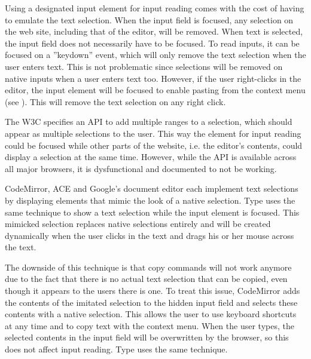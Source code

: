 Using a designated input element for input reading comes with the cost of having to emulate the text selection. When the input field is focused, any selection on the web site, including that of the editor, will be removed. When text is selected, the input field does not necessarily have to be focused. To read inputs, it can be focused on a ''keydown'' event, which will only remove the text selection when the user enters text. This is not problematic since selections will be removed on native inputs when a user enters text too. However, if the user right-clicks in the editor, the input element will be focused to enable pasting from the context menu (see ). This will remove the text selection on any right click.

The W3C specifies an API to add multiple ranges to a selection, which should appear as multiple selections to the user. This way the element for input reading could be focused while other parts of the website, i.e. the editor's contents, could display a selection at the same time. However, while the API is available across all major browsers, it is dysfunctional and documented to not be working.

CodeMirror, ACE and Google's document editor each implement text selections by displaying  elements that mimic the look of a native selection. Type uses the same technique to show a text selection while the input element is focused. This mimicked selection replaces native selections entirely and will be created dynamically when the user clicks in the text and drags his or her mouse across the text.

The downside of this technique is that copy commands will not work anymore due to the fact that there is no actual text selection that can be copied, even though it appears to the users there is one. To treat this issue, CodeMirror adds the contents of the imitated selection to the hidden input field and selects these contents with a native selection. This allows the user to use keyboard shortcuts at any time and to copy text with the context menu. When the user types, the selected contents in the input field will be overwritten by the browser, so this does not affect input reading. Type uses the same technique.

